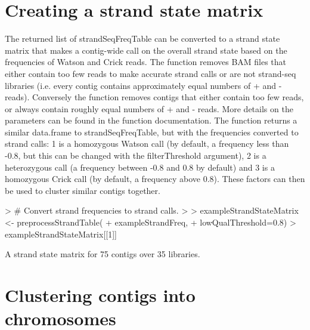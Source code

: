 \documentclass{article}
\begin{document}
\section{Creating a strand state matrix}

The returned list of strandSeqFreqTable can be converted to a strand state matrix that makes a contig-wide call on the overall strand state based on the frequencies of Watson and Crick reads. The function removes BAM files that either contain too few reads to make accurate strand calls or are not strand-seq libraries (i.e. every contig contains approximately equal numbers of + and - reads). Conversely the function removes contigs that either contain too few reads, or always contain roughly equal numbers of + and - reads.  More details on the parameters can be found in the function documentation.  The function returns a similar data.frame to strandSeqFreqTable, but with the frequencies converted to strand calls: 1 is a homozygous Watson call (by default, a frequency less than -0.8, but this can be changed with the filterThreshold argument), 2 is a heterozygous call (a frequency between -0.8 and 0.8 by default) and 3 is a homozygous Crick call (by default, a frequency above 0.8).  These factors can then be used to cluster similar contigs together.\\


\begin{Schunk}
\begin{Sinput}
> # Convert strand frequencies to strand calls.
> 
> exampleStrandStateMatrix <- preprocessStrandTable(
+ exampleStrandFreq, 
+ lowQualThreshold=0.8)
> exampleStrandStateMatrix[[1]]
\end{Sinput}
\begin{Soutput}
A strand state matrix for  75  contigs over  35  libraries.
\end{Soutput}
\end{Schunk}

\section{Clustering contigs into chromosomes}
\end{document}
